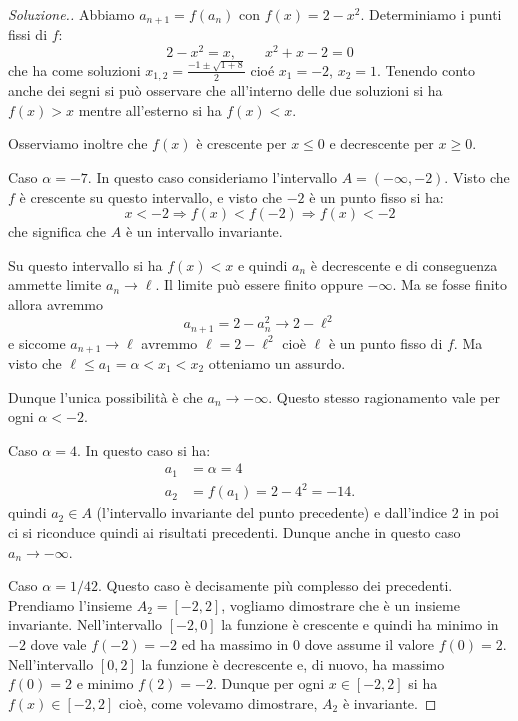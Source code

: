 \documentclass[italian,a4paper]{scrartcl}
\begin{document}
\begin{proof}[Soluzione.]
  Abbiamo $a_{n+1} = f(a_n)$ con $f(x) = 2-x^2$. Determiniamo i punti
  fissi di $f$:
  \[
  2-x^2 = x, \qquad x^2 + x - 2 = 0
  \]
  che ha come soluzioni $x_{1,2} = \frac{-1\pm\sqrt{1+8}}{2}$ cioé
  $x_1 = -2$, $x_2 = 1$. Tenendo conto anche dei segni si può
  osservare che all'interno delle due soluzioni si ha $f(x)>x$ mentre
  all'esterno si ha $f(x)<x$.

  Osserviamo inoltre che $f(x)$ è crescente per
  $x\le 0$ e decrescente per $x\ge 0$.

  Caso $\alpha=-7$. In questo caso consideriamo l'intervallo
  $A=(-\infty, -2)$. Visto che $f$ è crescente su questo intervallo,
  e visto che $-2$ è un punto fisso si ha:
  \[
  x < -2 \Rightarrow f(x) < f(-2) \Rightarrow f(x) < -2
  \]
  che significa che $A$ è un intervallo invariante.

  Su questo intervallo si ha $f(x)<x$ e quindi $a_n$ è decrescente e
  di conseguenza ammette limite $a_n\to \ell$. Il limite può essere
  finito oppure $-\infty$. Ma se fosse finito allora avremmo
  \[
  a_{n+1} = 2 - a_n^2 \to 2 - \ell^2
  \]
  e siccome $a_{n+1}\to \ell$ avremmo $\ell = 2 - \ell^2$ cioè $\ell$
  è un punto fisso di $f$. Ma visto che $\ell \le a_1 = \alpha < x_1 <
  x_2$ otteniamo un assurdo.

  Dunque l'unica possibilità è che $a_n \to -\infty$. Questo
  stesso ragionamento vale per ogni $\alpha<-2$.

  Caso $\alpha=4$. In questo caso si ha:
  \begin{align*}
    a_1 &= \alpha = 4\\
    a_2 &= f(a_1) = 2 - 4^2 = -14.
  \end{align*}
  quindi $a_2 \in A$ (l'intervallo invariante del punto precedente) e
  dall'indice $2$ in poi ci si riconduce quindi ai risultati
  precedenti. Dunque anche in questo caso $a_n \to -\infty$.

  Caso $\alpha = 1/42$. Questo caso è decisamente più complesso dei
  precedenti. Prendiamo l'insieme $A_2 = [-2, 2]$, vogliamo dimostrare
  che è un insieme invariante. Nell'intervallo $[-2,0]$ la funzione è
  crescente e quindi ha minimo in $-2$ dove vale $f(-2)=-2$ ed ha
  massimo in $0$ dove assume il valore $f(0) = 2$. Nell'intervallo
  $[0,2]$ la funzione è decrescente e, di nuovo, ha massimo $f(0)=2$ e
  minimo $f(2)=-2$. Dunque per ogni $x\in [-2,2]$ si ha $f(x) \in
  [-2,2]$ cioè, come volevamo dimostrare, $A_2$ è invariante.


\end{proof}
\end{document}
